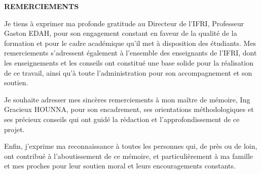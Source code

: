 \thispagestyle{empty}

\vspace*{3cm}

\begin{center}
\Large \textbf{REMERCIEMENTS}
\end{center}

\vspace{1cm}

Je tiens à exprimer ma profonde gratitude au Directeur de l'IFRI, Professeur Gaston EDAH, pour son engagement constant en faveur de la qualité de la formation et pour le cadre académique qu'il met à disposition des étudiants. Mes remerciements s'adressent également à l'ensemble des enseignants de l'IFRI, dont les enseignements et les conseils ont constitué une base solide pour la réalisation de ce travail, ainsi qu'à toute l'administration pour son accompagnement et son soutien.

\medskip

Je souhaite adresser mes sincères remerciements à mon maître de mémoire, Ing Gracieux HOUNNA, pour son encadrement, ses orientations méthodologiques et ses précieux conseils qui ont guidé la rédaction et l'approfondissement de ce projet.

\medskip

Enfin, j'exprime ma reconnaissance à toutes les personnes qui, de près ou de loin, ont contribué à l'aboutissement de ce mémoire, et particulièrement à ma famille et mes proches pour leur soutien moral et leurs encouragements constants.

\vfill
